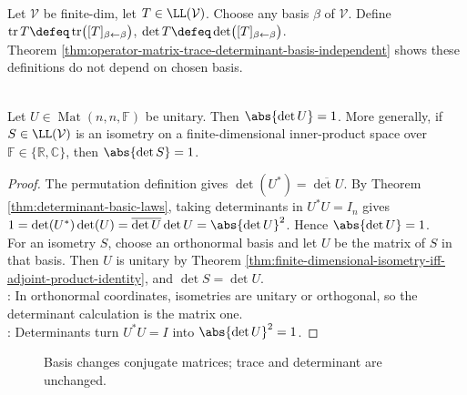 \begin{definition} \label{def:operator-trace-and-determinant} \\
Let $\mathcal{V}$ be finite-dim, let $T\in\LL(\mathcal{V})$. Choose any basis $\beta$ of $\mathcal{V}$. Define $\operatorname{tr}T\defeq\operatorname{tr}\bigl([T]_{\beta\leftarrow\beta}\bigr)$, $\det T\defeq\det\bigl([T]_{\beta\leftarrow\beta}\bigr)$.\\
Theorem \ref{thm:operator-matrix-trace-determinant-basis-independent} shows these definitions do not depend on chosen basis.
\end{definition}

\begin{proposition} \label{prop:isometry-determinant-absolute-one} \\
Let $U\in\operatorname{Mat}(n,n,\mathbb{F})$ be unitary. Then $\abs{\det U}=1$. More generally, if $S\in\LL(\mathcal{V})$ is an isometry on a finite-dimensional inner-product space over $\mathbb{F}\in\{\mathbb{R},\mathbb{C}\}$, then $\abs{\det S}=1$.
\begin{proof}
The permutation definition gives $\det(U^*)=\overline{\det U}$. By Theorem \ref{thm:determinant-basic-laws}, taking determinants in $U^*U=I_n$ gives $1=\det(U^*)\det(U)=\overline{\det U}\det U=\abs{\det U}^2$. Hence $\abs{\det U}=1$.\\
For an isometry $S$, choose an orthonormal basis and let $U$ be the matrix of $S$ in that basis. Then $U$ is unitary by Theorem \ref{thm:finite-dimensional-isometry-iff-adjoint-product-identity}, and $\det S=\det U$.\\
: In orthonormal coordinates, isometries are unitary or orthogonal, so the determinant calculation is the matrix one.\\
: Determinants turn $U^*U=I$ into $\abs{\det U}^2=1$.
\end{proof}
\end{proposition}

\begin{figure}[H]
  \centering
  
  \caption{Basis changes conjugate matrices; trace and determinant are unchanged.}
  \label{fig:operator-trace-determinant-basis-invariance}
\end{figure}

